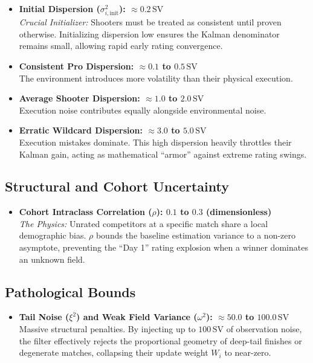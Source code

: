 \documentclass[12pt]{article}
\begin{document}
	\begin{itemize}
		\item \textbf{Initial Dispersion ($\sigma_{i,\mathrm{init}}^2$): $\approx 0.2\,\text{SV}$}\\
		\textit{Crucial Initializer:} Shooters must be treated as consistent until proven otherwise. Initializing dispersion low ensures the Kalman denominator remains small, allowing rapid early rating convergence.
		\item \textbf{Consistent Pro Dispersion: $\approx 0.1$ to $0.5\,\text{SV}$}\\
		The environment introduces more volatility than their physical execution.
		\item \textbf{Average Shooter Dispersion: $\approx 1.0$ to $2.0\,\text{SV}$}\\
		Execution noise contributes equally alongside environmental noise.
		\item \textbf{Erratic Wildcard Dispersion: $\approx 3.0$ to $5.0\,\text{SV}$}\\
		Execution mistakes dominate. This high dispersion heavily throttles their Kalman gain, acting as mathematical ``armor'' against extreme rating swings.
	\end{itemize}
	
	\subsection{Structural and Cohort Uncertainty}
	\begin{itemize}
		\item \textbf{Cohort Intraclass Correlation ($\rho$): $0.1$ to $0.3$ (dimensionless)}\\
		\textit{The Physics:} Unrated competitors at a specific match share a local demographic bias. $\rho$ bounds the baseline estimation variance to a non-zero asymptote, preventing the ``Day 1'' rating explosion when a winner dominates an unknown field.
	\end{itemize}
	
	\subsection{Pathological Bounds}
	\begin{itemize}
		\item \textbf{Tail Noise ($\xi^2$) and Weak Field Variance ($\omega^2$): $\approx 50.0$ to $100.0\,\text{SV}$}\\
		Massive structural penalties. By injecting up to $100\,\text{SV}$ of observation noise, the filter effectively rejects the proportional geometry of deep-tail finishes or degenerate matches, collapsing their update weight $W_i$ to near-zero.
	\end{itemize}
	
\end{document}
